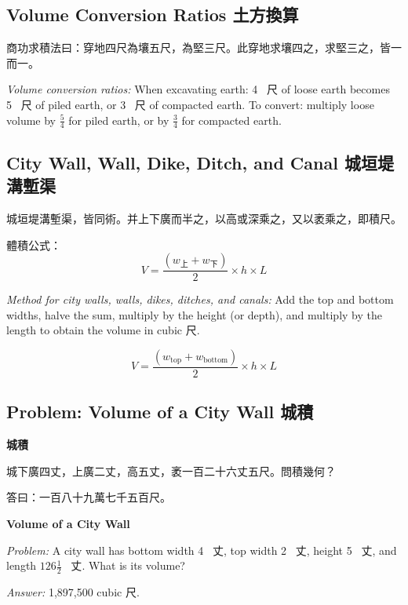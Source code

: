 \documentclass[11pt,a4paper]{article}
\newcommand{\zh}[1]{{\CJKfamily{\CJKrmdefault} #1}}
\newenvironment{chside}{%
  \begin{minipage}[t]{0.48\textwidth}%
  \setlength{\parindent}{1.5em}%
  \linespread{1.25}\selectfont%
  \small%
}{%
  \end{minipage}%
}
\newenvironment{enside}{%
  \hfill\begin{minipage}[t]{0.48\textwidth}%
  \setlength{\parindent}{1em}%
  \linespread{1.15}\selectfont%
  \small%
}{%
  \end{minipage}%
}
\begin{document}
\subsection{Volume Conversion Ratios \zh{土方換算}}

\noindent\begin{chside}
\zh{商功求積法曰：穿地四尺為壤五尺，為堅三尺。此穿地求壤四之，求堅三之，皆一而一。}
\end{chside}%
\begin{enside}
\textit{Volume conversion ratios:} When excavating earth: 4~\zh{尺} of loose
earth becomes 5~\zh{尺} of piled earth, or 3~\zh{尺} of compacted earth. To
convert: multiply loose volume by $\frac{5}{4}$ for piled earth, or by
$\frac{3}{4}$ for compacted earth.
\end{enside}

\subsection{City Wall, Wall, Dike, Ditch, and Canal \zh{城垣堤溝塹渠}}

\noindent\begin{chside}
\zh{城垣堤溝塹渠，皆同術。并上下廣而半之，以高或深乘之，又以袤乘之，即積尺。}

體積公式：
\[ V = \frac{(w_{\text{上}} + w_{\text{下}})}{2} \times h \times L \]
\end{chside}%
\begin{enside}
\textit{Method for city walls, walls, dikes, ditches, and canals:} Add the
top and bottom widths, halve the sum, multiply by the height (or depth), and
multiply by the length to obtain the volume in cubic \zh{尺}.

\[
V = \frac{(w_{\text{top}} + w_{\text{bottom}})}{2} \times h \times L
\]
\end{enside}

\subsection{Problem: Volume of a City Wall \zh{城積}}

\noindent\begin{chside}
\noindent\textbf{城積}

\zh{城下廣四丈，上廣二丈，高五丈，袤一百二十六丈五尺。問積幾何？}

\medskip
\zh{答曰：一百八十九萬七千五百尺。}
\end{chside}%
\begin{enside}
\noindent\textbf{Volume of a City Wall}

\textit{Problem:} A city wall has bottom width 4~\zh{丈}, top width 2~\zh{丈},
height 5~\zh{丈}, and length $126\frac{1}{2}$~\zh{丈}. What is its volume?

\medskip
\textit{Answer:} 1,897,500 cubic \zh{尺}.
\end{enside}
\end{document}
